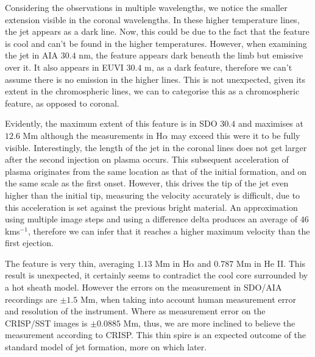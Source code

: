 Considering the observations in multiple wavelengths, we notice the smaller extension visible in the coronal wavelengths.
In these higher temperature lines, the jet appears as a dark line.
Now, this could be due to the fact that the feature is cool and can't be found in the higher temperatures.
However, when examining the jet in AIA $30.4$ nm, the feature appears dark beneath the limb but emissive over it.
It also appears in EUVI $30.4$ m, as a dark feature, therefore we can't assume there is no emission in the higher lines.
This is not unexpected, given its extent in the chromospheric lines, we can to categorise this as a chromospheric feature, as opposed to coronal.

Evidently, the maximum extent of this feature is in SDO $30.4$ and maximises at $12.6$ Mm although the measurements in H$\alpha$ may exceed this were it to be fully visible.
Interestingly, the length of the jet in the coronal lines does not get larger after the second injection on plasma occurs.
This subsequent acceleration of plasma originates from the same location as that of the initial formation, and on the same scale as the first onset.
However, this drives the tip of the jet even higher than the initial tip, measuring the velocity accurately is difficult, due to this acceleration is set against the previous bright material.
An approximation using multiple image steps and using a difference delta produces an average of $46$ kms${^{-1}}$, therefore we can infer that it reaches a higher maximum velocity than the first ejection.

The feature is very thin, averaging $1.13$ Mm in H$\alpha$ and $0.787$ Mm in He II. 
This result is unexpected, it certainly seems to contradict the cool core surrounded by a hot sheath model.
However the errors on the measurement in SDO/AIA recordings are $\pm1.5$ Mm, when taking into account human measurement error and resolution of the instrument.
Where as measurement error on the CRISP/SST images is $\pm0.0885$ Mm, thus, we are more inclined to believe the measurement according to CRISP.
This thin spire is an expected outcome of the standard model of jet formation, more on which later.

